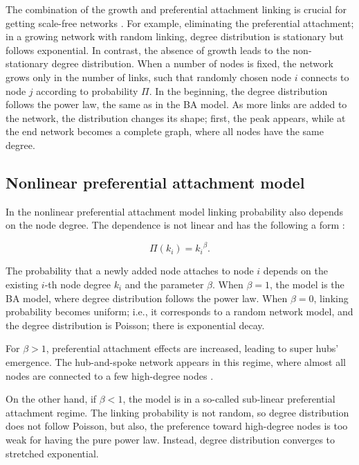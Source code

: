 The combination of the growth and preferential attachment linking is crucial for getting scale-free networks \cite{barabasi1999}. For example, eliminating the preferential attachment; in a growing network with random linking, degree distribution is stationary but follows exponential. In contrast, the absence of growth leads to the non-stationary degree distribution. When a number of nodes is fixed, the network grows only in the number of links, such that randomly chosen node $i$ connects to node $j$ according to probability $\Pi$. In the beginning, the degree distribution follows the power law, the same as in the BA model. As more links are added to the network, the distribution changes its shape; first, the peak appears, while at the end network becomes a complete graph, where all nodes have the same degree.  

\subsection{Nonlinear preferential attachment model}

In the nonlinear preferential attachment model linking probability also depends on the node degree. The dependence is not linear and has the following a form \cite{krapivsky2001}:

\begin{equation}
\Pi(k_i) = {k_i}^{\beta}.
\end{equation} 

The probability that a newly added node attaches to node $i$ depends on the existing $i$-th node degree $k_i$ and the parameter $\beta$. When $\beta=1$, the model is the BA model, where degree distribution follows the power law. When $\beta=0$, linking probability becomes uniform; i.e., it corresponds to a random network model, and the degree distribution is Poisson; there is exponential decay. 

For $\beta>1$, preferential attachment effects are increased, leading to super hubs' emergence. The hub-and-spoke network appears in this regime, where almost all nodes are connected to a few high-degree nodes \cite{krapivsky2001}.

On the other hand, if $\beta<1$, the model is in a so-called sub-linear preferential attachment regime. The linking probability is not random, so degree distribution does not follow Poisson, but also, the preference toward high-degree nodes is too weak for having the pure power law. Instead, degree distribution converges to stretched exponential.


